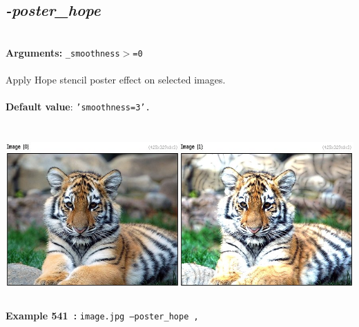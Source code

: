 \documentclass[a4paper,11pt,twoside]{book}
\begin{document}
\subsection{\emph{-poster\_hope} }\vspace*{-0.5em}
~\\\textbf{Arguments: } 
{\small \texttt{\_smoothness$>$=0}}\\~\\
Apply Hope stencil poster effect on selected images.
~\\~\\\textbf{Default value}: {\small \texttt{'smoothness=3'.}}
\begin{center}\includegraphics[keepaspectratio=true,height=7cm,width=\textwidth]{img/gmic_def541.jpg}\\
{\footnotesize \textbf{Example 541~:} \texttt{image.jpg --poster\_hope ,}}
\end{center}
\end{document}
